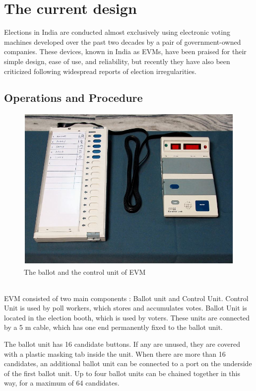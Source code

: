 \documentclass[a4paper,12pt,openany]{book}
\begin{document}
\chapter{The current design}
Elections in India are conducted almost exclusively using electronic voting machines developed over
the past two decades by a pair of government-owned companies. These devices, known in India as EVMs,
have been praised for their simple design, ease of use, and reliability, but recently they have also been
criticized following widespread reports of election irregularities.

\section{Operations and Procedure}
\begin{figure}[!h]
\centering
\includegraphics[scale=0.4]{EVM_with_Control_Unit.JPG}
\caption{The ballot and the control unit of EVM}
\end{figure}
\\
EVM consisted of two main components : Ballot unit and Control Unit.
Control Unit is used by poll
workers, which stores and accumulates votes.
Ballot Unit
is located in the election booth, which is
used by voters. These units are connected by a 5 m cable, which has one end permanently fixed to the ballot
unit.


The ballot unit has 16 candidate buttons. If any are unused, they are covered with a plastic masking tab
inside the unit. When there are more than 16 candidates, an additional ballot unit can be connected to a port on
the underside of the first ballot unit. Up to four ballot units can be chained together in this way, for a maximum
of 64 candidates.\\
\end{document}
